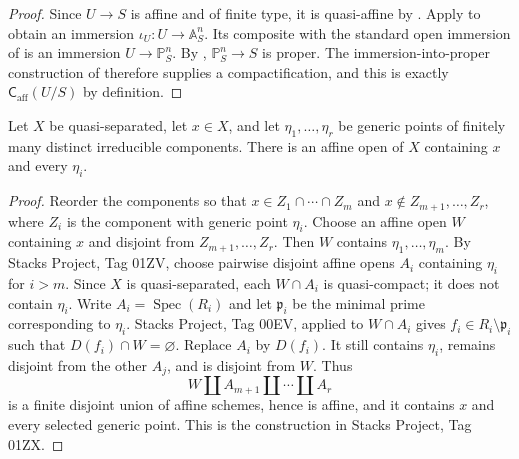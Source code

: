 \begin{proof}
  Since $U\to S$ is affine and of finite type, it is quasi-affine by
  .  Apply
   to obtain an
  immersion $\iota_U\colon U\to\mathbb A^n_S$.  Its composite with the
  standard open immersion of
   is an immersion
  $U\to\mathbb P^n_S$.  By
  , $\mathbb P^n_S\to S$ is proper.
  The immersion-into-proper construction of
   therefore supplies a
  compactification, and this is exactly
  $\mathsf C_{\mathrm{aff}}(U/S)$ by definition.
\end{proof}

\begin{lemma}
  \label{lemma:nagata-affine-neighbourhood-generic-points-exists}

  Let $X$ be quasi-separated, let $x\in X$, and let
  $\eta_1,\ldots,\eta_r$ be generic points of finitely many distinct
  irreducible components.  There is an affine open of $X$ containing $x$ and
  every $\eta_i$.
\end{lemma}

\begin{proof}
  Reorder the components so that
  $x\in Z_1\cap\cdots\cap Z_m$ and
  $x\notin Z_{m+1},\ldots,Z_r$, where $Z_i$ is the component with generic
  point $\eta_i$.  Choose an affine open $W$ containing $x$ and disjoint from
  $Z_{m+1},\ldots,Z_r$.  Then $W$ contains
  $\eta_1,\ldots,\eta_m$.  By Stacks Project, Tag 01ZV, choose pairwise
  disjoint affine opens $A_i$ containing $\eta_i$ for $i>m$.  Since $X$ is
  quasi-separated, each $W\cap A_i$ is quasi-compact; it does not contain
  $\eta_i$.  Write $A_i=\operatorname{Spec}(R_i)$ and let
  $\mathfrak p_i$ be the minimal prime corresponding to $\eta_i$.  Stacks
  Project, Tag 00EV, applied to $W\cap A_i$ gives
  $f_i\in R_i\setminus\mathfrak p_i$ such that
  $D(f_i)\cap W=\varnothing$.  Replace $A_i$ by $D(f_i)$.  It still contains
  $\eta_i$, remains disjoint from the other $A_j$, and is disjoint from $W$.
  Thus
  \[
    W\amalg A_{m+1}\amalg\cdots\amalg A_r
  \]
  is a finite disjoint union of affine schemes, hence is affine, and it
  contains $x$ and every selected generic point.  This is the construction in
  Stacks Project, Tag 01ZX.
\end{proof}

